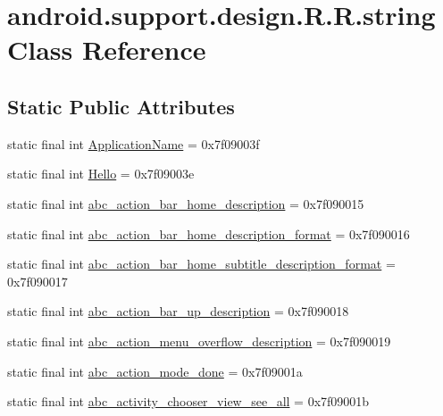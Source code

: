 \hypertarget{classandroid_1_1support_1_1design_1_1_r_1_1string}{
\section{android.support.design.R.R.string Class Reference}
\label{classandroid_1_1support_1_1design_1_1_r_1_1string}
}
\subsection*{Static Public Attributes}
\begin{CompactItemize}
\item 
static final int \hyperlink{classandroid_1_1support_1_1design_1_1_r_1_1string_1b36e68c1f8b75bc309ec67fd707c9da}{ApplicationName} = 0x7f09003f
\item 
static final int \hyperlink{classandroid_1_1support_1_1design_1_1_r_1_1string_c4a76c4647885a3b39de6a4bf957820b}{Hello} = 0x7f09003e
\item 
static final int \hyperlink{classandroid_1_1support_1_1design_1_1_r_1_1string_41f40787d19cfc993751b3f86a12cbb3}{abc\_\-action\_\-bar\_\-home\_\-description} = 0x7f090015
\item 
static final int \hyperlink{classandroid_1_1support_1_1design_1_1_r_1_1string_b5e97f3ec7b9d0f2e7ec9b3f4aab8c37}{abc\_\-action\_\-bar\_\-home\_\-description\_\-format} = 0x7f090016
\item 
static final int \hyperlink{classandroid_1_1support_1_1design_1_1_r_1_1string_e33831f3691493077ac87cde663423f5}{abc\_\-action\_\-bar\_\-home\_\-subtitle\_\-description\_\-format} = 0x7f090017
\item 
static final int \hyperlink{classandroid_1_1support_1_1design_1_1_r_1_1string_20a44605562059f94471076936f623be}{abc\_\-action\_\-bar\_\-up\_\-description} = 0x7f090018
\item 
static final int \hyperlink{classandroid_1_1support_1_1design_1_1_r_1_1string_0a5ebfdc9c35955ba9d337f4c4a50995}{abc\_\-action\_\-menu\_\-overflow\_\-description} = 0x7f090019
\item 
static final int \hyperlink{classandroid_1_1support_1_1design_1_1_r_1_1string_2d29e2c62588af38f4724ee6e9c62e8d}{abc\_\-action\_\-mode\_\-done} = 0x7f09001a
\item 
static final int \hyperlink{classandroid_1_1support_1_1design_1_1_r_1_1string_253a1676de90c8bd13248936a3850344}{abc\_\-activity\_\-chooser\_\-view\_\-see\_\-all} = 0x7f09001b

\end{CompactItemize}
